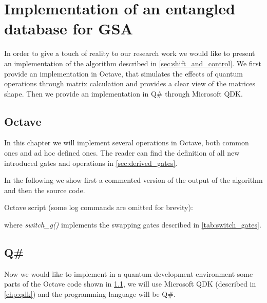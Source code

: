 
\chapter{Implementation of an entangled database for GSA}
\label{chp:implementation}

In order to give a touch of reality to our research work we would like to present an implementation of the algorithm described in \cref{sec:shift_and_control}. We first provide an implementation in Octave, that simulates the effects of quantum operations through matrix calculation and provides a clear view of the matrices shape. Then we provide an implementation in Q\# through Microsoft QDK.

\section{Octave}
\label{sec:octave_impl}

In this chapter we will implement several operations in Octave, both common ones and ad hoc defined ones. The reader can find the definition of all new introduced gates and operations in \cref{sec:derived_gates}.

In the following we show first a commented version of the output of the algorithm and then the source code.



\noindent Octave script (some log commands are omitted for brevity):



\noindent where \textit{switch\_g()} implements the swapping gates described in \cref{tab:switch_gates}.

\section{Q\#}
\label{sec:qs_impl}

Now we would like to implement in a quantum development environment some parts of the Octave code shown in \cref{sec:octave_impl}, we will use Microsoft QDK (described in \cref{chp:qdk}) and the programming language will be Q\#.

\bigskip


